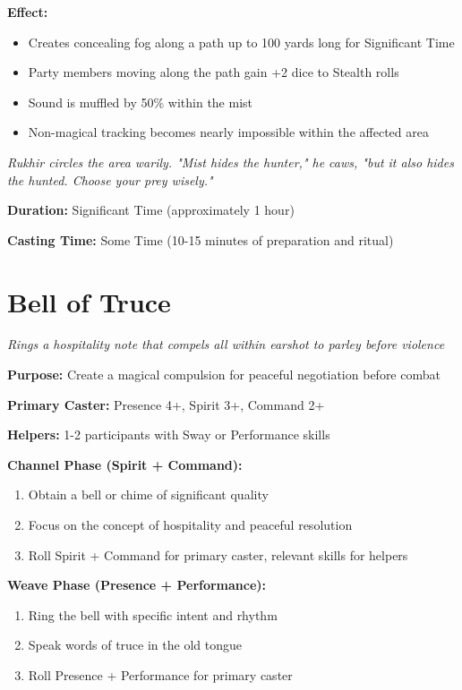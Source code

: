 \documentclass[12pt,twoside]{book}
\newcommand{\shadow}[1]{\textit{#1}}
\begin{document}
\textbf{Effect:}
\begin{itemize}
\item Creates concealing fog along a path up to 100 yards long for Significant Time
\item Party members moving along the path gain +2 dice to Stealth rolls
\item Sound is muffled by 50\% within the mist
\item Non-magical tracking becomes nearly impossible within the affected area
\end{itemize}

\shadow{Rukhir circles the area warily. "Mist hides the hunter," he caws, "but it also hides the hunted. Choose your prey wisely."}

\textbf{Duration:} Significant Time (approximately 1 hour)

\textbf{Casting Time:} Some Time (10-15 minutes of preparation and ritual)

\section*{Bell of Truce}
\textit{Rings a hospitality note that compels all within earshot to parley before violence}

\textbf{Purpose:} Create a magical compulsion for peaceful negotiation before combat

\textbf{Primary Caster:} Presence 4+, Spirit 3+, Command 2+

\textbf{Helpers:} 1-2 participants with Sway or Performance skills

\textbf{Channel Phase (Spirit + Command):}
\begin{enumerate}
\item Obtain a bell or chime of significant quality
\item Focus on the concept of hospitality and peaceful resolution
\item Roll Spirit + Command for primary caster, relevant skills for helpers
\end{enumerate}

\textbf{Weave Phase (Presence + Performance):}
\begin{enumerate}
\item Ring the bell with specific intent and rhythm
\item Speak words of truce in the old tongue
\item Roll Presence + Performance for primary caster
\end{enumerate}
\end{document}
